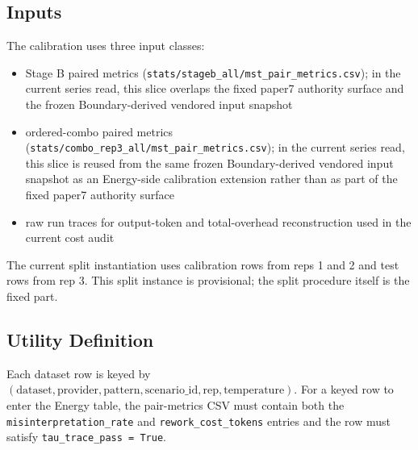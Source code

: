 \documentclass[11pt,a4paper]{article}
\begin{document}
\subsection{Inputs}
\label{sec:inputs}

The calibration uses three input classes:
\begin{itemize}
  \item Stage B paired metrics (\texttt{stats/stageb\_all/mst\_pair\_metrics.csv}); in the current series read, this slice overlaps the fixed paper7 authority surface and the frozen Boundary-derived vendored input snapshot
  \item ordered-combo paired metrics (\texttt{stats/combo\_rep3\_all/mst\_pair\_metrics.csv}); in the current series read, this slice is reused from the same frozen Boundary-derived vendored input snapshot as an Energy-side calibration extension rather than as part of the fixed paper7 authority surface
  \item raw run traces for output-token and total-overhead reconstruction used in the current cost audit
\end{itemize}

The current split instantiation uses calibration rows from reps 1 and 2 and test rows from rep 3. This split instance is provisional; the split procedure itself is the fixed part.

\subsection{Utility Definition}
\label{sec:utility}

Each dataset row is keyed by
\((\mathrm{dataset}, \mathrm{provider}, \mathrm{pattern}, \mathrm{scenario\_id}, \mathrm{rep}, \mathrm{temperature})\).
For a keyed row to enter the Energy table, the pair-metrics CSV must contain both
the \texttt{misinterpretation\_rate} and \texttt{rework\_cost\_tokens} entries and
the row must satisfy \texttt{tau\_trace\_pass = True}.
\end{document}
